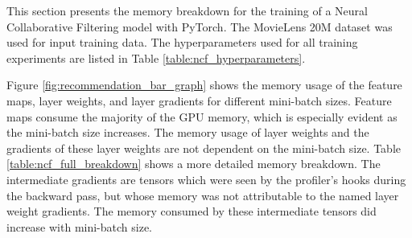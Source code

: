 \documentclass[12pt,letterpaper]{article}
\begin{document}
%
%
This section presents the memory breakdown for the training of a Neural Collaborative Filtering \cite{ncf} model with PyTorch. The MovieLens 20M dataset \cite{ml-20m} was used for input training data. The hyperparameters used for all training experiments are listed in Table \ref{table:ncf_hyperparameters}.


\begin{table}[H]
\centering
{}
\caption{Hyperparameters used for NCF memory profiling experiments}
\label{table:ncf_hyperparameters}
\end{table}

Figure \ref{fig:recommendation_bar_graph} shows the memory usage of the feature maps, layer weights, and layer gradients for different mini-batch sizes. Feature maps consume the majority of the GPU memory, which is especially evident as the mini-batch size increases. The memory usage of layer weights and the gradients of these layer weights are not dependent on the mini-batch size. Table \ref{table:ncf_full_breakdown} shows a more detailed memory breakdown. The intermediate gradients are tensors which were seen by the profiler's hooks during the backward pass, but whose memory was not attributable to the named layer weight gradients. The memory consumed by these intermediate tensors did increase with mini-batch size.
\end{document}
